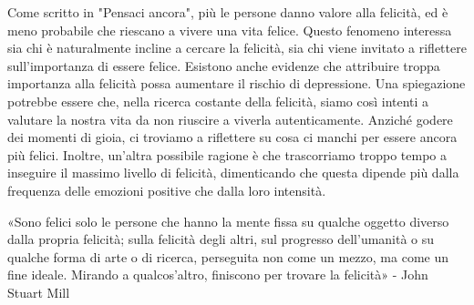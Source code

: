 \documentclass[12pt]{book} %
\begin{document}
Come scritto in "Pensaci ancora", più le persone danno valore alla felicità, ed è meno probabile che riescano a vivere una vita felice. Questo fenomeno interessa sia chi è naturalmente incline a cercare la felicità, sia chi viene invitato a riflettere sull'importanza di essere felice. Esistono anche evidenze che attribuire troppa importanza alla felicità possa aumentare il rischio di depressione. Una spiegazione potrebbe essere che, nella ricerca costante della felicità, siamo così intenti a valutare la nostra vita da non riuscire a viverla autenticamente. Anziché godere dei momenti di gioia, ci troviamo a riflettere su cosa ci manchi per essere ancora più felici. Inoltre, un’altra possibile ragione è che trascorriamo troppo tempo a inseguire il massimo livello di felicità, dimenticando che questa dipende più dalla frequenza delle emozioni positive che dalla loro intensità.

«Sono felici solo le persone che hanno la mente fissa su qualche oggetto diverso dalla propria felicità; sulla felicità degli altri, sul progresso dell’umanità o su qualche forma di arte o di ricerca, perseguita non come un mezzo, ma come un fine ideale. Mirando a qualcos’altro, finiscono per trovare la felicità» - John Stuart Mill
\end{document}

